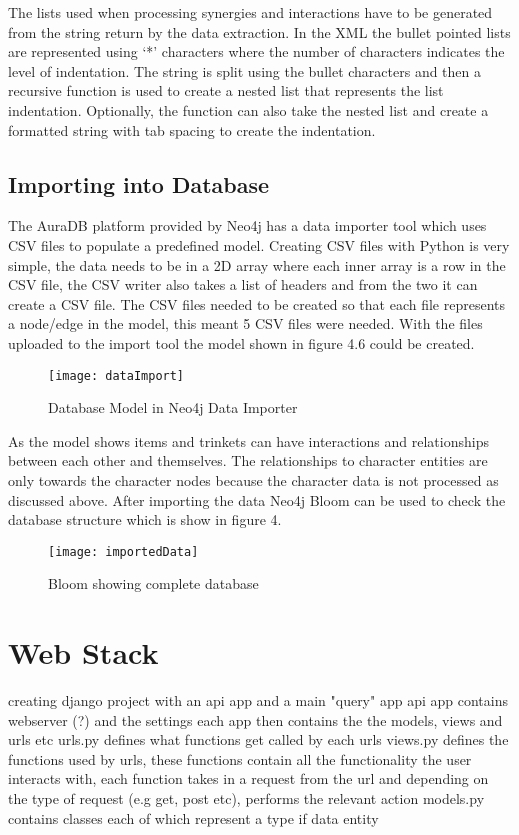 The lists used when processing synergies and interactions have to be generated from the string return by the data extraction.
In the XML the bullet pointed lists are represented using `*' characters where the number of characters indicates the level of indentation.
The string is split using the bullet characters and then a recursive function is used to create a nested list that represents the list indentation.
Optionally, the function can also take the nested list and create a formatted string with tab spacing to create the indentation.
\subsection{Importing into Database}
The AuraDB platform provided by Neo4j has a data importer tool which uses CSV files to populate a predefined model. 
Creating CSV files with Python is very simple, the data needs to be in a 2D array where each inner array is a row in the CSV file,
the CSV writer also takes a list of headers and from the two it can create a CSV file. The CSV files needed to be created so that each file represents 
a node/edge in the model, this meant 5 CSV files were needed. With the files uploaded to the import tool the model shown in figure 4.6 could be created.
\begin{figure}[H]
    \centering
    \texttt{[image: dataImport]}
    \caption{Database Model in Neo4j Data Importer}
\end{figure}
As the model shows items and trinkets can have interactions and relationships between each other and themselves. The relationships to character 
entities are only towards the character nodes because the character data is not processed as discussed above.
After importing the data Neo4j Bloom can be used to check the database structure which is show in figure 4.
\begin{figure}[H]
    \centering
    \texttt{[image: importedData]}
    \caption{Bloom showing complete database}
\end{figure}
\section{Web Stack}
creating django project with an api app and a main "query" app
api app contains webserver (?) and the settings
each app then contains the the models, views and urls etc
urls.py defines what functions get called by each urls
views.py defines the functions used by urls, these functions contain all the functionality the user interacts with,
each function takes in a request from the url and depending on the type of request (e.g get, post etc), performs the relevant action
models.py contains classes each of which represent a type if data entity

